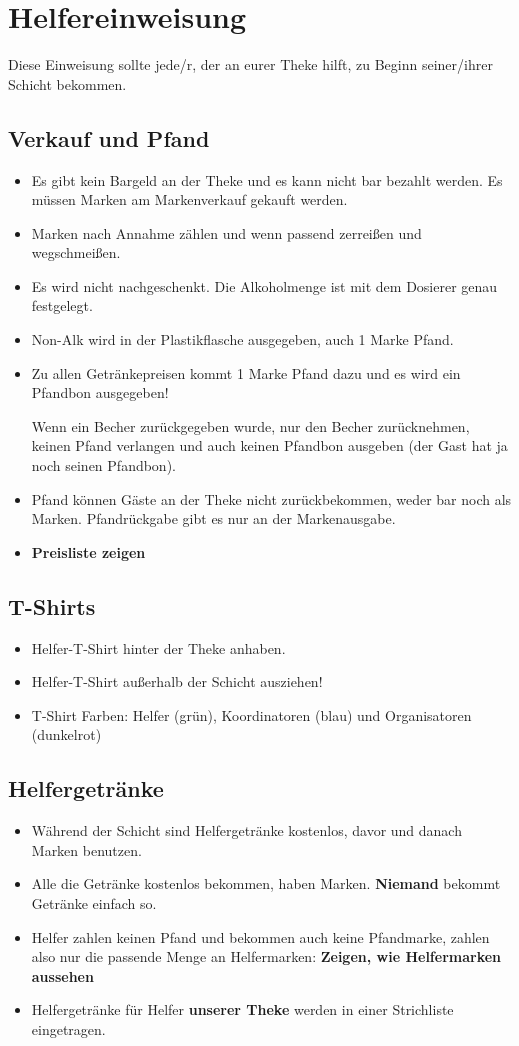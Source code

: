 \section{Helfereinweisung}
Diese Einweisung sollte jede/r, der an eurer Theke hilft, zu Beginn seiner/ihrer Schicht bekommen.
\subsection{Verkauf und Pfand}
\begin{itemize}
  \renewcommand{\labelitemi}{$\Box$}
  \item Es gibt kein Bargeld an der Theke und es kann nicht bar bezahlt werden. Es müssen Marken am Markenverkauf gekauft werden.
  \item Marken nach Annahme zählen und wenn passend zerreißen und wegschmeißen.
  \item Es wird nicht nachgeschenkt. Die Alkoholmenge ist mit dem Dosierer genau festgelegt.
  \item Non-Alk wird in der Plastikflasche ausgegeben, auch 1 Marke Pfand.
  \item Zu allen Getränkepreisen kommt 1 Marke Pfand dazu und es wird ein Pfandbon ausgegeben!
    
    Wenn ein Becher zurückgegeben wurde, nur den Becher zurücknehmen, keinen Pfand verlangen und auch keinen Pfandbon ausgeben (der Gast hat ja noch seinen Pfandbon).
  \item Pfand können Gäste an der Theke nicht zurückbekommen, weder bar noch als Marken. Pfandrückgabe gibt es nur an der Markenausgabe.
  \item \textbf{Preisliste zeigen}
\end{itemize}
\subsection{T-Shirts}
\begin{itemize}
  \renewcommand{\labelitemi}{$\Box$}
  \item Helfer-T-Shirt hinter der Theke anhaben.
  \item Helfer-T-Shirt außerhalb der Schicht ausziehen!
  \item T-Shirt Farben: Helfer (grün), Koordinatoren (blau) und Organisatoren (dunkelrot)
\end{itemize}
\subsection{Helfergetränke}
\begin{itemize}
  \renewcommand{\labelitemi}{$\Box$}
  \item Während der Schicht sind Helfergetränke kostenlos, davor und danach Marken benutzen.
  \item Alle die Getränke kostenlos bekommen, haben Marken. \textbf{Niemand} bekommt Getränke einfach so.
  \item Helfer zahlen keinen Pfand und bekommen auch keine Pfandmarke, zahlen also nur die passende Menge an Helfermarken: \textbf{Zeigen, wie Helfermarken aussehen}
  \item Helfergetränke für Helfer \textbf{unserer Theke} werden in einer Strichliste eingetragen.
\end{itemize}
